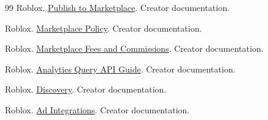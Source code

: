 \begin{thebibliography}{99}
 Roblox. \href{https://create.roblox.com/docs/marketplace/publish-to-marketplace}{Publish to Marketplace}. Creator documentation.

 Roblox. \href{https://create.roblox.com/docs/marketplace/marketplace-policy}{Marketplace Policy}. Creator documentation.

 Roblox. \href{https://create.roblox.com/docs/marketplace/marketplace-fees-and-commissions}{Marketplace Fees and Commissions}. Creator documentation.

 Roblox. \href{https://create.roblox.com/docs/cloud/guides/analytics}{Analytics Query API Guide}. Creator documentation.

 Roblox. \href{https://create.roblox.com/docs/discovery}{Discovery}. Creator documentation.

 Roblox. \href{https://create.roblox.com/docs/production/promotion/ad-integrations}{Ad Integrations}. Creator documentation.

\end{thebibliography}
